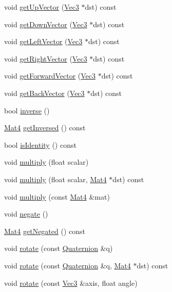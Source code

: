 \begin{DoxyCompactItemize}
void \hyperlink{classMat4_af0d374798883b8b0315025707df6329d}{get\+Up\+Vector} (\hyperlink{classVec3}{Vec3} $\ast$dst) const
\item 
void \hyperlink{classMat4_a2219e0177bc699742b7f0531b10a8054}{get\+Down\+Vector} (\hyperlink{classVec3}{Vec3} $\ast$dst) const
\item 
void \hyperlink{classMat4_a53f91ec013e8a83c5b7a2395e17c626d}{get\+Left\+Vector} (\hyperlink{classVec3}{Vec3} $\ast$dst) const
\item 
void \hyperlink{classMat4_a5154fc9675a1d8fdc136c4a0ac19a41f}{get\+Right\+Vector} (\hyperlink{classVec3}{Vec3} $\ast$dst) const
\item 
void \hyperlink{classMat4_a1b53f818aab2f341af761e9ca738ab1f}{get\+Forward\+Vector} (\hyperlink{classVec3}{Vec3} $\ast$dst) const
\item 
void \hyperlink{classMat4_aa1f197b8d1e34ebf41bf7c222119b11b}{get\+Back\+Vector} (\hyperlink{classVec3}{Vec3} $\ast$dst) const
\item 
bool \hyperlink{classMat4_a22528a64ce3ee80e93150dea45408e44}{inverse} ()
\item 
\hyperlink{classMat4}{Mat4} \hyperlink{classMat4_aa49b12b2cd25b28ab50e2ac41de592b4}{get\+Inversed} () const
\item 
bool \hyperlink{classMat4_a3309850f850ef88e57e3b9b17af3371e}{is\+Identity} () const
\item 
void \hyperlink{classMat4_a45bc83fe1011e2c02f3d0ed9ae9081c4}{multiply} (float scalar)
\item 
void \hyperlink{classMat4_a24498dcc626d53062cb021046fa19a52}{multiply} (float scalar, \hyperlink{classMat4}{Mat4} $\ast$dst) const
\item 
void \hyperlink{classMat4_aba98567f451a133a0a3a8bad1a88ad90}{multiply} (const \hyperlink{classMat4}{Mat4} \&mat)
\item 
void \hyperlink{classMat4_a4e99a7b8e550d6a0f1e9a5d9f1305206}{negate} ()
\item 
\hyperlink{classMat4}{Mat4} \hyperlink{classMat4_ae500d08f05972355bb6213ad955091e7}{get\+Negated} () const
\item 
void \hyperlink{classMat4_a1cc6787b1cf29ce48df616a6aabe3096}{rotate} (const \hyperlink{classQuaternion}{Quaternion} \&q)
\item 
void \hyperlink{classMat4_a638b21eb95ee5240a780562e7099de4c}{rotate} (const \hyperlink{classQuaternion}{Quaternion} \&q, \hyperlink{classMat4}{Mat4} $\ast$dst) const
\item 
void \hyperlink{classMat4_a6bb112d2f8aebd87cddc46fedcd855e1}{rotate} (const \hyperlink{classVec3}{Vec3} \&axis, float angle)

\end{DoxyCompactItemize}
